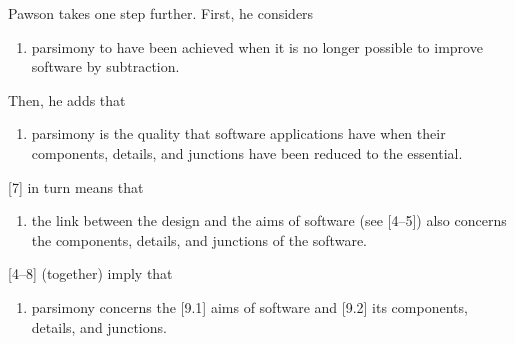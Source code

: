 Pawson 
\parencite*[][]{pawson_minimum_1998} %
 takes one step further. First, he considers



\setcounter{saveenum}{\value{enumi}}

\begin{enumerate}

\setcounter{enumi}{\value{saveenum}}

\item parsimony to have been achieved when it is no longer possible to improve software by subtraction.

\end{enumerate}

Then, he adds that



\setcounter{saveenum}{\value{enumi}}

\begin{enumerate}

\setcounter{enumi}{\value{saveenum}}

\item parsimony is the quality that software applications have when their components, details, and junctions have been reduced to the essential.

\end{enumerate}

[7] in turn means that



\setcounter{saveenum}{\value{enumi}}

\begin{enumerate}

\setcounter{enumi}{\value{saveenum}}

\item the link between the design and the aims of software (see [4–5]) also concerns the components, details, and junctions of the software.

\end{enumerate}

[4–8] (together) imply that



\setcounter{saveenum}{\value{enumi}}

\begin{enumerate}

\setcounter{enumi}{\value{saveenum}}

\item parsimony concerns the [9.1] aims of software and [9.2] its components, details, and junctions.

\end{enumerate}

